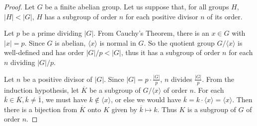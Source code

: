 \documentclass{article}
\begin{document}
\begin{proof}
    Let $G$ be a finite abelian group. Let us suppose that, for all groups $H$, $|H| < |G|$, $H$ has a subgroup of order $n$ for each positive divisor $n$ of its order.

    Let $p$ be a prime dividing $|G|$. From Cauchy's Theorem, there is an $x \in G$ with $|x| = p$. Since $G$ is abelian, $\langle x \rangle$ is normal in $G$. So the quotient group $G/\langle x \rangle$ is well-defined and has order $|G|/p < |G|$, thus it has a subgroup of order $n$ for each $n$ dividing $|G|/p$.
    
    Let $n$ be a positive divisor of $|G|$. Since $|G| = p \cdot \frac{|G|}{p}$, $n$ divides $\frac{|G|}{p}$. From the induction hypothesis, let $\overline{K}$ be a subgroup of $G/\langle x \rangle$ of order $n$. For each $\overline{k} \in \overline{K}, \overline{k} \neq \overline{1}$, we must have $k \notin \langle x \rangle$, or else we would have $\overline{k} = k \cdot \langle x \rangle = \langle x \rangle$. Then there is a bijection from $\overline{K}$ onto $K$ given by $\overline{k} \mapsto k$. Thus $K$ is a subgroup of $G$ of order $n$.
\end{proof}
\end{document}
